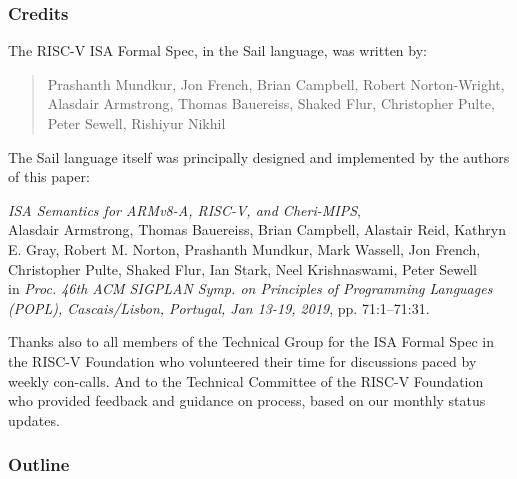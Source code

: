 \documentclass[aspectratio=169]{beamer}
\newcommand{\slidefont}{\scriptsize}
\begin{document}
\begin{frame}[fragile]
  \frametitle{Credits}

  \slidefont

  The RISC-V ISA Formal Spec, in the Sail language, was written by:

  \begin{quote}
    Prashanth Mundkur,
    Jon French,
    Brian Campbell,
    Robert Norton-Wright,
    Alasdair Armstrong,
    Thomas Bauereiss,
    Shaked Flur,
    Christopher Pulte,
    Peter Sewell,
    Rishiyur Nikhil
  \end{quote}

  \vspace{4ex}

  The Sail language itself was principally designed and implemented by
  the authors of this paper:

  \vspace{1ex}

  \hfill \begin{minipage}{0.95\textwidth}
    \emph{ISA Semantics for ARMv8-A, RISC-V, and Cheri-MIPS}, \\
    Alasdair Armstrong,
    Thomas Bauereiss,
    Brian Campbell,
    Alastair Reid,
    Kathryn E. Gray,
    Robert M. Norton,
    Prashanth Mundkur,
    Mark Wassell,
    Jon French,
    Christopher Pulte,
    Shaked Flur,
    Ian Stark,
    Neel Krishnaswami,
    Peter Sewell \\
    in \emph{Proc. 46th ACM SIGPLAN Symp. on Principles of Programming
    Languages (POPL), Cascais/Lisbon, Portugal, Jan 13-19, 2019},
    pp. 71:1--71:31.
  \end{minipage}

  \vspace{2ex}

  Thanks also to all members of the Technical Group for the ISA Formal
  Spec in the RISC-V Foundation who volunteered their time for
  discussions paced by weekly con-calls.  And to the Technical
  Committee of the RISC-V Foundation who provided feedback and
  guidance on process, based on our monthly status updates.

\end{frame}


\begin{frame}[fragile]
  \frametitle{Outline}
  \tableofcontents
\end{frame}

\end{document}
